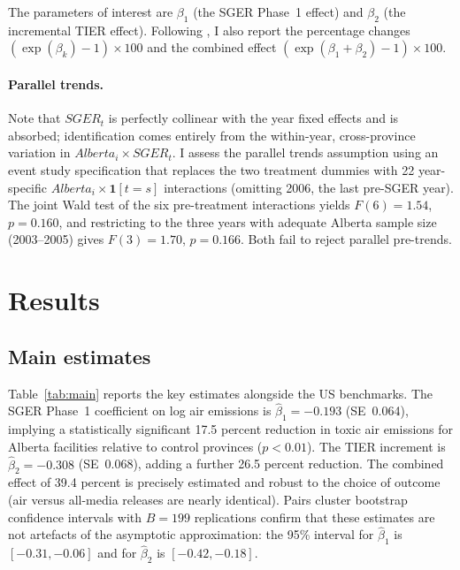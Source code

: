 \documentclass[12pt]{article}
\begin{document}
The parameters of interest are $\beta_1$ (the SGER Phase~1 effect) and
$\beta_2$ (the incremental TIER effect).
Following \citet{pham2024}, I also report the percentage changes
$(\exp(\beta_k)-1)\times 100$ and the combined effect
$(\exp(\beta_1+\beta_2)-1)\times 100$.

\paragraph{Parallel trends.}
Note that $\mathit{SGER}_t$ is perfectly collinear with the year fixed
effects and is absorbed; identification comes entirely from the
within-year, cross-province variation in $\mathit{Alberta}_i \times
\mathit{SGER}_t$.
I assess the parallel trends assumption using an event study specification
that replaces the two treatment dummies with 22 year-specific
$\mathit{Alberta}_i \times \mathbf{1}[t=s]$ interactions (omitting 2006,
the last pre-SGER year).
The joint Wald test of the six pre-treatment interactions yields
$F(6)=1.54$, $p=0.160$, and restricting to the three years with adequate
Alberta sample size (2003--2005) gives $F(3)=1.70$, $p=0.166$.
Both fail to reject parallel pre-trends.

\section{Results}

\subsection*{Main estimates}

Table~\ref{tab:main} reports the key estimates alongside the
\citet{pham2024} US benchmarks.
The SGER Phase~1 coefficient on log air emissions is
$\hat\beta_1 = -0.193$ (SE~0.064), implying a statistically significant
17.5 percent reduction in toxic air emissions for Alberta facilities
relative to control provinces ($p < 0.01$).
The TIER increment is $\hat\beta_2 = -0.308$ (SE~0.068), adding a further
26.5 percent reduction.
The combined effect of 39.4 percent is precisely estimated and robust
to the choice of outcome (air versus all-media releases are nearly identical).
Pairs cluster bootstrap confidence intervals with $B=199$ replications confirm
that these estimates are not artefacts of the asymptotic approximation:
the 95\% interval for $\hat\beta_1$ is $[-0.31, -0.06]$ and for $\hat\beta_2$
is $[-0.42, -0.18]$.
\end{document}
